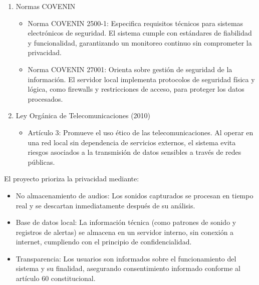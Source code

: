 \begin{enumerate}
\begin{itemize}
        \end{itemize}
  \item Normas COVENIN
        \begin{itemize}
          \item Norma COVENIN 2500-1: Especifica requisitos técnicos para sistemas electrónicos de seguridad. El sistema cumple con estándares de fiabilidad y funcionalidad, garantizando un monitoreo continuo sin comprometer la privacidad.
          \item Norma COVENIN 27001: Orienta sobre gestión de seguridad de la información. El servidor local implementa protocolos de seguridad física y lógica, como firewalls y restricciones de acceso, para proteger los datos procesados.
        \end{itemize}
  \item Ley Orgánica de Telecomunicaciones (2010)
        \begin{itemize}
          \item Artículo 3: Promueve el uso ético de las telecomunicaciones. Al operar en una red local sin dependencia de servicios externos, el sistema evita riesgos asociados a la transmisión de datos sensibles a través de redes públicas.
        \end{itemize}
\end{enumerate}

El proyecto prioriza la privacidad mediante:
\begin{itemize}
  \item No almacenamiento de audios: Los sonidos capturados se procesan en tiempo real y se descartan inmediatamente después de su análisis.
  \item Base de datos local: La información técnica (como patrones de sonido y registros de alertas) se almacena en un servidor interno, sin conexión a internet, cumpliendo con el principio de confidencialidad.
  \item Transparencia: Los usuarios son informados sobre el funcionamiento del sistema y su finalidad, asegurando consentimiento informado conforme al artículo 60 constitucional.
\end{itemize}
